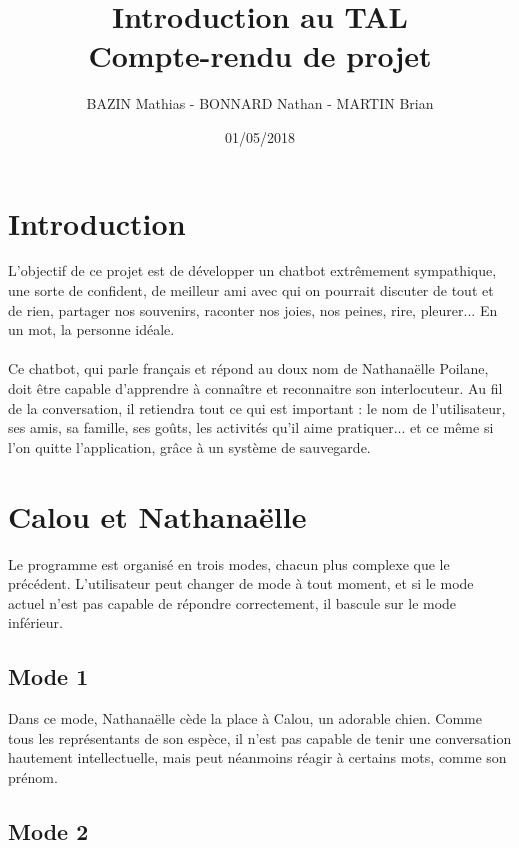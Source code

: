 \documentclass[paper=a4, fontsize=11pt]{article}
\begin{document}
\title{Introduction au TAL\\Compte-rendu de projet}
\author{BAZIN Mathias - BONNARD Nathan - MARTIN Brian}
\date{01/05/2018}
\maketitle

\vspace{1.0cm}

\section{Introduction}

L'objectif de ce projet est de développer un chatbot extrêmement sympathique, une sorte de confident, de meilleur ami avec qui on pourrait discuter de tout et de rien, partager nos souvenirs, raconter nos joies, nos peines, rire, pleurer... En un mot, la personne idéale.
\paragraph{} Ce chatbot, qui parle français et répond au doux nom de Nathanaëlle Poilane, doit être capable d'apprendre à connaître et reconnaitre son interlocuteur. Au fil de la conversation, il retiendra tout ce qui est important : le nom de l'utilisateur, ses amis, sa famille, ses goûts, les activités qu'il aime pratiquer... et ce même si l'on quitte l'application, grâce à un système de sauvegarde.

\section{Calou et Nathanaëlle}

Le programme est organisé en trois modes, chacun plus complexe que le précédent. L'utilisateur peut changer de mode à tout moment, et si le mode actuel n'est pas capable de répondre correctement, il bascule sur le mode inférieur.

\subsection{Mode 1}

Dans ce mode, Nathanaëlle cède la place à Calou, un adorable chien. Comme tous les représentants de son espèce, il n'est pas capable de tenir une conversation hautement intellectuelle, mais peut néanmoins réagir à certains mots, comme son prénom.

\subsection{Mode 2}
\end{document}
